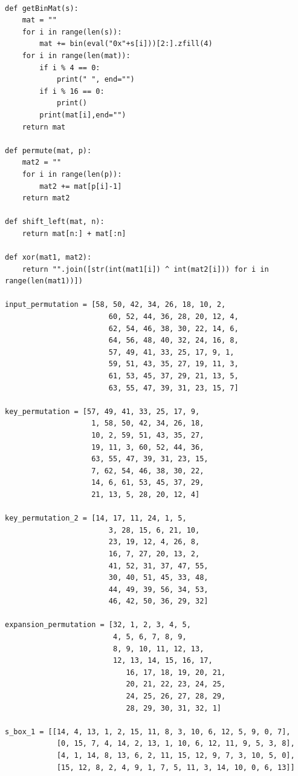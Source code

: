 \documentclass{article}
\begin{document}
\begin{verbatim}

def getBinMat(s):
    mat = ""
    for i in range(len(s)):
        mat += bin(eval("0x"+s[i]))[2:].zfill(4)
    for i in range(len(mat)):
        if i % 4 == 0:
            print(" ", end="")
        if i % 16 == 0:
            print()
        print(mat[i],end="")
    return mat

def permute(mat, p):
    mat2 = ""
    for i in range(len(p)):
        mat2 += mat[p[i]-1]
    return mat2

def shift_left(mat, n):
    return mat[n:] + mat[:n]

def xor(mat1, mat2):
    return "".join([str(int(mat1[i]) ^ int(mat2[i])) for i in range(len(mat1))])

input_permutation = [58, 50, 42, 34, 26, 18, 10, 2,
                        60, 52, 44, 36, 28, 20, 12, 4,
                        62, 54, 46, 38, 30, 22, 14, 6,
                        64, 56, 48, 40, 32, 24, 16, 8,
                        57, 49, 41, 33, 25, 17, 9, 1,
                        59, 51, 43, 35, 27, 19, 11, 3,
                        61, 53, 45, 37, 29, 21, 13, 5,
                        63, 55, 47, 39, 31, 23, 15, 7]

key_permutation = [57, 49, 41, 33, 25, 17, 9,
                    1, 58, 50, 42, 34, 26, 18,
                    10, 2, 59, 51, 43, 35, 27,
                    19, 11, 3, 60, 52, 44, 36,
                    63, 55, 47, 39, 31, 23, 15,
                    7, 62, 54, 46, 38, 30, 22,
                    14, 6, 61, 53, 45, 37, 29,
                    21, 13, 5, 28, 20, 12, 4]

key_permutation_2 = [14, 17, 11, 24, 1, 5,
                        3, 28, 15, 6, 21, 10,
                        23, 19, 12, 4, 26, 8,
                        16, 7, 27, 20, 13, 2,
                        41, 52, 31, 37, 47, 55,
                        30, 40, 51, 45, 33, 48,
                        44, 49, 39, 56, 34, 53,
                        46, 42, 50, 36, 29, 32]

expansion_permutation = [32, 1, 2, 3, 4, 5,
                         4, 5, 6, 7, 8, 9,
                         8, 9, 10, 11, 12, 13,
                         12, 13, 14, 15, 16, 17,
                            16, 17, 18, 19, 20, 21,
                            20, 21, 22, 23, 24, 25,
                            24, 25, 26, 27, 28, 29,
                            28, 29, 30, 31, 32, 1]

s_box_1 = [[14, 4, 13, 1, 2, 15, 11, 8, 3, 10, 6, 12, 5, 9, 0, 7],
            [0, 15, 7, 4, 14, 2, 13, 1, 10, 6, 12, 11, 9, 5, 3, 8],
            [4, 1, 14, 8, 13, 6, 2, 11, 15, 12, 9, 7, 3, 10, 5, 0],
            [15, 12, 8, 2, 4, 9, 1, 7, 5, 11, 3, 14, 10, 0, 6, 13]]


\end{verbatim}
\end{document}
